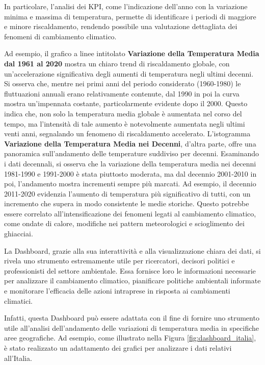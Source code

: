 In particolare, l'analisi dei KPI, come l'indicazione dell'anno con la variazione minima e massima di temperatura, permette di identificare i periodi di maggiore e minore riscaldamento, rendendo possibile una valutazione dettagliata dei fenomeni di cambiamento climatico. 

Ad esempio, il grafico a linee intitolato \textbf{Variazione della Temperatura Media dal 1961 al 2020} mostra un chiaro trend di riscaldamento globale, con un'accelerazione significativa degli aumenti di temperatura negli ultimi decenni. Si osserva che, mentre nei primi anni del periodo considerato (1960-1980) le fluttuazioni annuali erano relativamente contenute, dal 1990 in poi la curva mostra un'impennata costante, particolarmente evidente dopo il 2000. Questo indica che, non solo la temperatura media globale è aumentata nel corso del tempo, ma l'intensità di tale aumento è notevolmente aumentata negli ultimi venti anni, segnalando un fenomeno di riscaldamento accelerato. L'istogramma \textbf{Variazione della Temperatura Media nei Decenni}, d'altra parte, offre una panoramica sull'andamento delle temperature suddiviso per decenni. Esaminando i dati decennali, si osserva che la variazione della temperatura media nei decenni 1981-1990 e 1991-2000 è stata piuttosto moderata, ma dal decennio 2001-2010 in poi, l'andamento mostra incrementi sempre più marcati. Ad esempio, il decennio 2011-2020 evidenzia l'aumento di temperatura più significativo di tutti, con un incremento che supera in modo consistente le medie storiche. Questo potrebbe essere correlato all'intensificazione dei fenomeni legati al cambiamento climatico, come ondate di calore, modifiche nei pattern meteorologici e scioglimento dei ghiacciai.

La Dashboard, grazie alla sua interattività e alla visualizzazione chiara dei dati, si rivela uno strumento estremamente utile per ricercatori, decisori politici e professionisti del settore ambientale. Essa fornisce loro le informazioni necessarie per analizzare il cambiamento climatico, pianificare politiche ambientali informate e monitorare l'efficacia delle azioni intraprese in risposta ai cambiamenti climatici. 

Infatti, questa Dashboard può essere adattata con il fine di fornire uno strumento utile all'analisi dell'andamento delle variazioni di temperatura media in specifiche aree geografiche. Ad esempio, come illustrato nella Figura \ref{fig:dashboard_italia}, è stato realizzato un adattamento dei grafici per analizzare i dati relativi all'Italia. 

